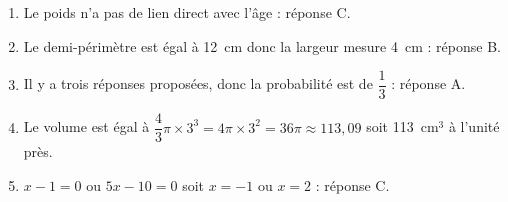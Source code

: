
\medskip

%
%
%
\begin{enumerate}
\item Le poids n'a pas de lien direct avec l'âge : réponse C.
\item Le demi-périmètre est égal à 12~cm donc la largeur mesure 4~cm : réponse B.
\item Il y a trois réponses proposées, donc la probabilité est de $\dfrac{1}{3}$ : réponse A.
\item Le volume est égal à $\dfrac{4}{3}\pi \times 3^3 = 4\pi \times 3^2 = 36\pi\approx 113,09$ soit 113~cm$^3$ à l'unité près.
\item $x - 1 = 0$ ou $5x - 10 = 0$ soit $x = - 1$ ou $x = 2$ : réponse C.
\end{enumerate}

\vspace{0,5cm}

